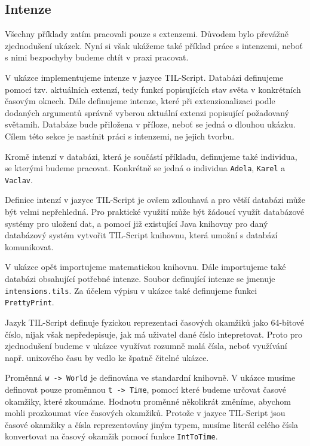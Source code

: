 \subsection{Intenze}

Všechny příklady zatím pracovali pouze s extenzemi. Důvodem bylo převážně zjednodušení ukázek.
Nyní si však ukážeme také příklad práce s intenzemi, neboť s nimi bezpochyby budeme chtít v praxi
pracovat.

V ukázce implementujeme intenze v jazyce TIL-Script. Databázi definujeme pomocí tzv. aktuálních
extenzí, tedy funkcí popisujících stav světa v konkrétních časovým oknech. Dále definujeme intenze,
které při extenzionalizaci podle dodaných argumentů správně vyberou aktuální extenzi popisující
požadovaný světamih. Databáze bude přiložena v příloze, neboť se jedná o dlouhou ukázku. Cílem této
sekce je nastínit práci s intenzemi, ne jejich tvorbu.

Kromě intenzí v databázi, která je součástí příkladu, definujeme také individua, se kterými budeme
pracovat. Konkrétně se jedná o individua \lstinline{Adela}, \lstinline{Karel} a \lstinline{Vaclav}.

Definice intenzí v jazyce TIL-Script je ovšem zdlouhavá a pro větší databázi může být velmi
nepřehledná. Pro praktické využití může být žádoucí využít databázové systémy pro uložení dat,
a pomocí již existující Java knihovny pro daný databázový systém vytvořit TIL-Script knihovnu,
která umožní s databází komunikovat.

V ukázce opět importujeme matematickou knihovnu. Dále importujeme také databázi obsahující potřebné
intenze. Soubor definující intenze se jmenuje \lstinline{intensions.tils}. Za účelem výpisu v ukázce
také definujeme funkci \lstinline{PrettyPrint}.

Jazyk TIL-Script definuje fyzickou reprezentaci časových okamžiků jako 64-bitové číslo, nijak však
nepředepisuje, jak má uživatel dané číslo intepretovat. Proto pro zjednodušení budeme v ukázce
využívat rozumně malá čísla, neboť využívání např. unixového času by vedlo ke špatně čitelné ukázce.

Proměnná \lstinline{w -> World} je definována ve standardní knihovně. V ukázce musíme definovat
pouze proměnnou \lstinline{t -> Time}, pomocí které budeme určovat časové okamžiky, které zkoumáme.
Hodnotu proměnné několikrát změníme, abychom mohli prozkoumat více časových okamžiků. Protože
v jazyce TIL-Script jsou časové okamžiky a čísla reprezentovány jiným typem, musíme literál celého
čísla konvertovat na časový okamžik pomocí funkce \lstinline{IntToTime}.


